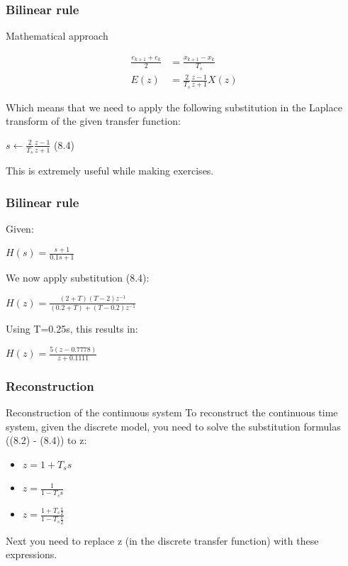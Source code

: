 \begin{frame}
	\frametitle{Bilinear rule}
	\begin{block}{Mathematical approach}
		\begin{center}
			\begin{align*}
			\frac{e_{k+1} + e_k}{2} &= \frac{x_{k+1} - x_{k}}{T_s}\\
			E(z) &= \frac{2}{T_s}\frac{z - 1}{z + 1} X(z)
			\end{align*}
		\end{center}
		Which means that we need to apply the following substitution in the Laplace transform of the given transfer function:
		\begin{center}
			$s \gets \frac{2}{T_s} \frac{z-1}{z+1}$ (8.4)
		\end{center}
		This is extremely useful while making exercises.
	\end{block}
\end{frame}

\begin{frame}
	\frametitle{Bilinear rule}
	\begin{example}
		Given:
		\begin{center}
			$H(s) = \frac{s + 1}{0.1s + 1}$
		\end{center}
		We now apply substitution (8.4):
		\begin{center}
			$H(z) = \frac{(2 + T)(T - 2)z^{-1}}{(0.2 + T) + (T - 0.2)z^{-1}}$
		\end{center}
		Using T=0.25s, this results in:
		\begin{center}
			$H(z) = \frac{5(z - 0.7778)}{z + 0.1111}$
		\end{center}
	\end{example}
\end{frame}

\begin{frame}
	\frametitle{Reconstruction}
	\begin{block}{Reconstruction of the continuous system}
		To reconstruct the continuous time system, given the discrete model, you need to solve the substitution formulas ((8.2) - (8.4)) to z: 
		\begin{itemize}
			\item $z = 1 + T_ss$
			\item $z = \frac{1}{1 - T_ss}$
			\item $z = \frac{1 + T_s\frac{s}{2}}{1 - T_s\frac{s}{2}}$
		\end{itemize}
		Next you need to replace z (in the discrete transfer function) with these expressions. 
	\end{block}
\end{frame}

